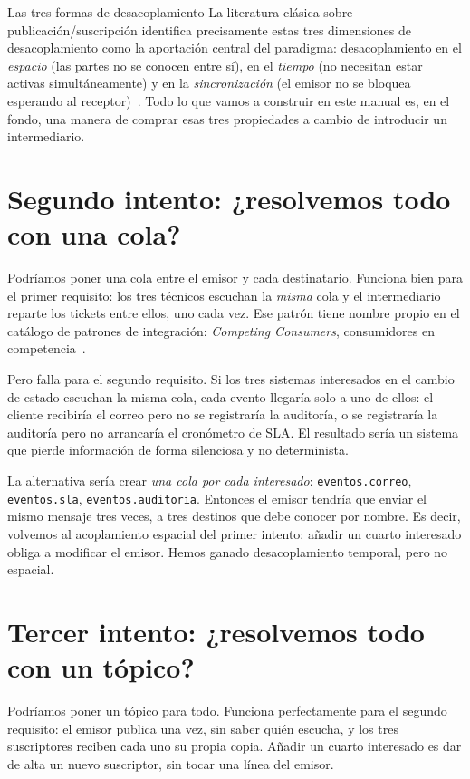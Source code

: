 \documentclass[11pt,a4paper]{book}
\begin{document}
\begin{cajaDef}{Las tres formas de desacoplamiento}
	La literatura clásica sobre publicación/suscripción identifica precisamente estas tres dimensiones de desacoplamiento como la aportación central del paradigma: desacoplamiento en el \emph{espacio} (las partes no se conocen entre sí), en el \emph{tiempo} (no necesitan estar activas simultáneamente) y en la \emph{sincronización} (el emisor no se bloquea esperando al receptor)~\cite{eugster2003manyfaces}.
	Todo lo que vamos a construir en este manual es, en el fondo, una manera de comprar esas tres propiedades a cambio de introducir un intermediario.
\end{cajaDef}

\section{Segundo intento: ¿resolvemos todo con una cola?}

Podríamos poner una cola entre el emisor y cada destinatario.
Funciona bien para el primer requisito: los tres técnicos escuchan la \emph{misma} cola y el intermediario reparte los tickets entre ellos, uno cada vez.
Ese patrón tiene nombre propio en el catálogo de patrones de integración: \emph{Competing Consumers}, consumidores en competencia~\cite{hohpe2003eip}.

Pero falla para el segundo requisito.
Si los tres sistemas interesados en el cambio de estado escuchan la misma cola, cada evento llegaría solo a uno de ellos: el cliente recibiría el correo pero no se registraría la auditoría, o se registraría la auditoría pero no arrancaría el cronómetro de SLA.
El resultado sería un sistema que pierde información de forma silenciosa y no determinista.

La alternativa sería crear \emph{una cola por cada interesado}: \texttt{eventos.correo}, \texttt{eventos.sla}, \texttt{eventos.auditoria}.
Entonces el emisor tendría que enviar el mismo mensaje tres veces, a tres destinos que debe conocer por nombre.
Es decir, volvemos al acoplamiento espacial del primer intento: añadir un cuarto interesado obliga a modificar el emisor.
Hemos ganado desacoplamiento temporal, pero no espacial.

\section{Tercer intento: ¿resolvemos todo con un tópico?}

Podríamos poner un tópico para todo.
Funciona perfectamente para el segundo requisito: el emisor publica una vez, sin saber quién escucha, y los tres suscriptores reciben cada uno su propia copia.
Añadir un cuarto interesado es dar de alta un nuevo suscriptor, sin tocar una línea del emisor.
\end{document}
